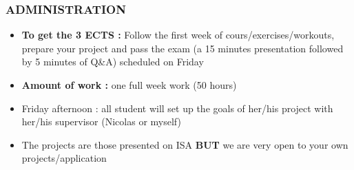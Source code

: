 \begin{frame}[containsverbatim]
\frametitle{ADMINISTRATION}
\begin{itemize}
	\item{\textbf{To get the 3 ECTS :} Follow the first week of cours/exercises/workouts, prepare your project and pass the exam (a 15 minutes presentation followed by 5 minutes of Q\&A) scheduled on Friday }
	\item{\textbf{Amount of work :} one full week work (50 hours)}
	\item{Friday afternoon : all student will set up the goals of her/his project with her/his supervisor (Nicolas or myself) }
	\item{The projects are those presented on ISA \textbf{BUT} we are very open to your own projects/application}
\end{itemize}
\end{frame}


